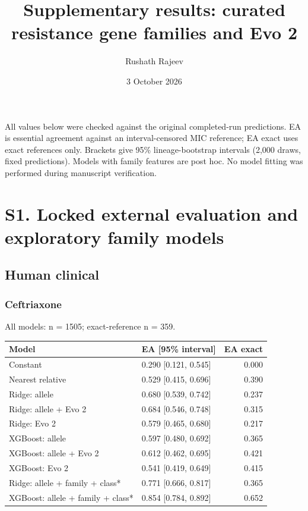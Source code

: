 \documentclass[
  10pt,
]{article}
\title{Supplementary results: curated resistance gene families and Evo
2}
\author{Rushath Rajeev}
\date{3 October 2026}
\newcounter{none} %
\begin{document}
\maketitle

All values below were checked against the original completed-run
predictions. EA is essential agreement against an interval-censored MIC
reference; EA exact uses exact references only. Brackets give 95\%
lineage-bootstrap intervals (2,000 draws, fixed predictions). Models
with family features are post hoc. No model fitting was performed during
manuscript verification.

\section{S1. Locked external evaluation and exploratory family
models}\label{s1.-locked-external-evaluation-and-exploratory-family-models}

\subsection{Human clinical}\label{human-clinical}

\subsubsection{Ceftriaxone}\label{ceftriaxone}

All models: n = 1505; exact-reference n = 359.

{\def\LTcaptype{none} %
\begin{longtable}[]{@{}llr@{}}
\toprule\noalign{}
Model & EA {[}95\% interval{]} & EA exact \\
\midrule\noalign{}
\endhead
\bottomrule\noalign{}
\endlastfoot
Constant & 0.290 {[}0.121, 0.545{]} & 0.000 \\
Nearest relative & 0.529 {[}0.415, 0.696{]} & 0.390 \\
Ridge: allele & 0.680 {[}0.539, 0.742{]} & 0.237 \\
Ridge: allele + Evo 2 & 0.684 {[}0.546, 0.748{]} & 0.315 \\
Ridge: Evo 2 & 0.579 {[}0.465, 0.680{]} & 0.217 \\
XGBoost: allele & 0.597 {[}0.480, 0.692{]} & 0.365 \\
XGBoost: allele + Evo 2 & 0.612 {[}0.462, 0.695{]} & 0.421 \\
XGBoost: Evo 2 & 0.541 {[}0.419, 0.649{]} & 0.415 \\
Ridge: allele + family + class* & 0.771 {[}0.666, 0.817{]} & 0.365 \\
XGBoost: allele + family + class* & 0.854 {[}0.784, 0.892{]} & 0.652 \\
\end{longtable}
}
\end{document}
